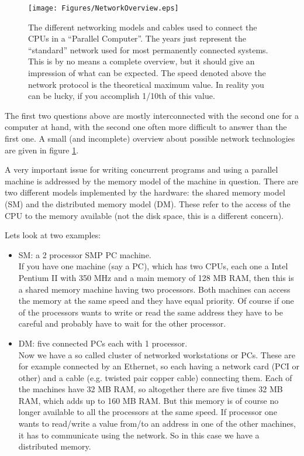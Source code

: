 \begin{figure}[htbp]
  \begin{center}
    \leavevmode
    \texttt{[image: Figures/NetworkOverview.eps]}
    \caption{The different networking models and cables used to connect
        the CPUs in a ``Parallel Computer''. The years just represent the
        ``standard'' network used for most permanently connected systems.
        This is by no means a complete overview, but it should give
        an impression of what can be expected. The speed denoted above
        the network protocol is the theoretical maximum value. In reality
        you can be lucky, if you accomplish 1/10th of this value.}
    \label{fig:NetworkOverview}
  \end{center}
\end{figure}
The first two questions above are mostly interconnected with the
second one for a computer at hand, 
with the second one often more difficult to answer than the first one. A 
small (and incomplete) overview about possible network  
technologies are given in figure \ref{fig:NetworkOverview}.

A very important issue for writing concurrent programs and using
a parallel machine is addressed by the memory model of the 
machine in question. There are two different models implemented
by the hardware: the shared memory model (SM) and the distributed
memory model (DM). These refer to the access of the CPU to the
memory available (not the disk space, this is a different concern).

Lets look at two examples:  
\begin{itemize}
\item SM: a 2 processor SMP PC machine.\\
If you have one machine (say a PC), which has two CPUs, each one a
Intel Pentium II with 350 MHz and a main memory of 128 MB RAM, then
this is a shared memory machine having two processors. Both machines
can access the memory at the same speed and they have equal priority.
Of course if one of the processors wants to write or read the same
address they have to be careful and probably have to wait for the other
processor.
\item DM: five connected PCs each with 1 processor.\\
Now we have a so called cluster of networked workstations or PCs.
These are for example connected by an Ethernet, so each having a 
network card (PCI or other) and a cable (e.g. twisted pair copper cable)
connecting them. Each of the machines have 32 MB RAM, so altogether
there are five times 32 MB RAM, which adds up to 160 MB RAM. But this
memory is of course no longer available to all the processors at the
same speed. If processor one wants to read/write a value from/to an address
in one of the other machines, it has to communicate using the network.
So in this case we have a distributed memory.
\end{itemize}

